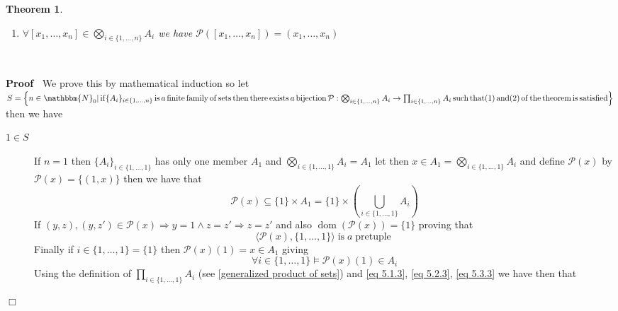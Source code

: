 \documentclass{book}
\newcommand{\tmop}[1]{\ensuremath{\operatorname{#1}}}
\newenvironment{proof}{\noindent\textbf{Proof\ }}{\hspace*{\fill}$\Box$\medskip}
\newtheorem{theorem}{Theorem}
\begin{document}
{{\begin{theorem}
\begin{enumerate}
    \item $\forall [x_1, \ldots, x_n] \in \bigotimes_{i \in \{ 1, \ldots, n
    \}} A_i$ we have $\mathcal{P} ([x_1, \ldots, x_n]) = (x_1, \ldots, x_n)$
  \end{enumerate}
  \begin{enumerate}
    \ 
  \end{enumerate}
\end{theorem}

\begin{proof}
  We prove this by mathematical induction so let $S = \left\{ n \in
  \mathbbm{N}_0 | \tmop{if} \{ A_i \}_{i \in \{ 1, \ldots, n \}} \tmop{is} a
  \tmop{finite} \tmop{family} \tmop{of} \tmop{sets} \tmop{then} \tmop{there}
  \tmop{exists} a \tmop{bijection} \mathcal{P}: \bigotimes_{i \in \{ 1,
  \ldots, n \}} A_i \rightarrow \prod_{i \in \{ 1, \ldots, n \}} A_i
  \tmop{such} \tmop{that} (1) \tmop{and} (2) \tmop{of} \tmop{the}
  \tmop{theorem} \tmop{is} \tmop{satisfied} \right\}$ then we have
  \begin{description}
    \item[$1 \in S$] If $n = 1$ then $\{ A_i \}_{i \in \{ 1, \ldots, 1 \}}$
    has only one member $A_1$ and $\bigotimes_{i \in \{ 1, \ldots, 1 \}} A_i =
    A_1$ let then $x \in A_1 = \bigotimes_{i \in \{ 1, \ldots, 1 \}} A_i$ and
    define $\mathcal{P} (x)$ by $\mathcal{P} (x) = \{ (1, x) \}$ then we have
    that
    \begin{equation}
      \label{eq 5.1.3} \mathcal{P} (x) \subseteq \{ 1 \} \times A_1 = \{ 1 \}
      \times \left( \bigcup_{i \in \{ 1, \ldots, 1 \}} A_i \right)
    \end{equation}
    If $(y, z), (y, z') \in \mathcal{P} (x) \Rightarrow y = 1 \wedge z = z'
    \Rightarrow z = z'$ and also $\tmop{dom} (\mathcal{P} (x)) = \{ 1 \}$
    proving that
    \begin{equation}
      \label{eq 5.2.3} \langle \mathcal{P} (x), \{ 1, \ldots, 1 \} \rangle
      \tmop{is} a \tmop{pretuple}
    \end{equation}
    Finally if $i \in \{ 1, \ldots, 1 \} = \{ 1 \}$ then $\mathcal{P} (x) (1)
    = x \in A_1$ giving
    \begin{equation}
      \label{eq 5.3.3} \forall i \in \{ 1, \ldots, 1 \} \vDash \mathcal{P} (x)
      (1) \in A_i
    \end{equation}
    Using the definition of $\prod_{i \in \{ 1, \ldots, 1 \}} A_i$ (see
    \ref{generalized product of sets}) and \ref{eq 5.1.3}, \ref{eq 5.2.3},
    \ref{eq 5.3.3} we have then that

\end{description}
\end{proof}}}
\end{document}
